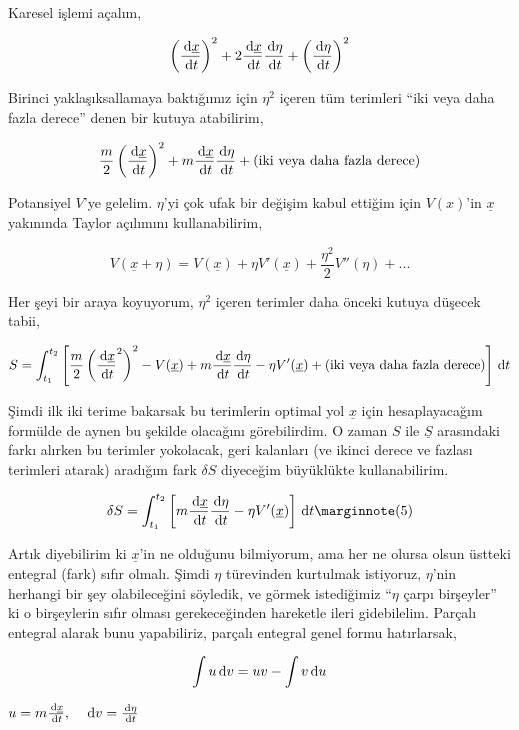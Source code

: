 \documentclass[12pt,fleqn]{article}\usepackage{../../common}
\begin{document}
Karesel işlemi açalım, 

$$ 
\left( \frac{\,\mathrm{d} \underline{x}}{\,\mathrm{d} t}\right)^2 + 
2 \frac{\,\mathrm{d} \underline{x}}{\,\mathrm{d} t} \frac{\,\mathrm{d} \eta}{\,\mathrm{d} t} +
\left( \frac{\,\mathrm{d} \eta}{\,\mathrm{d} t}\right)^2
$$

Birinci yaklaşıksallamaya baktığımız için $\eta^2$ içeren tüm terimleri
``iki veya daha fazla derece'' denen bir kutuya atabilirim, 

$$ 
\frac{m}{2} \left( \frac{\,\mathrm{d} \underline{x}}{\,\mathrm{d} t}\right)^2 + 
m \frac{\,\mathrm{d} \underline{x}}{\,\mathrm{d} t} \frac{\,\mathrm{d} \eta}{\,\mathrm{d} t} + 
(\textrm{iki veya daha fazla derece})
$$

Potansiyel $V$'ye gelelim. $\eta$'yi çok ufak bir değişim kabul ettiğim
için $V(x)$'in $\underline{x}$ yakınında Taylor açılımını kullanabilirim, 

$$ 
V(\underline{x} + \eta) = 
V(\underline{x}) + \eta V'(\underline{x}) + 
\frac{\eta^2}{2}V''(\eta) + ...
$$

Her şeyi bir araya koyuyorum, $\eta^2$ içeren terimler daha önceki kutuya
düşecek tabii, 

$$ 
S = \int_{t_1}^{t_2} \left[
\frac{m}{2} \left( \frac{\,\mathrm{d} \underline{x}}{\,\mathrm{d} t}^2 \right)^2
- V(\underline{x}) 
+ m \frac{\,\mathrm{d} \underline{x}}{\,\mathrm{d} t} \frac{\,\mathrm{d} \eta}{\,\mathrm{d} t} 
- \eta V'(\underline{x}) + (\textrm{iki veya daha fazla derece})
\right] \,\mathrm{d} t 
$$

Şimdi ilk iki terime bakarsak bu terimlerin optimal yol $\underline{x}$
için hesaplayacağım formülde de aynen bu şekilde olacağını görebilirdim. O
zaman $S$ ile $\underline{S}$ arasındaki farkı alırken bu terimler
yokolacak, geri kalanları (ve ikinci derece ve fazlası terimleri atarak)
aradığım fark $\delta S$ diyeceğim büyüklükte kullanabilirim.

$$ 
\delta S = \int_{t_1}^{t_2} \left[ 
m \frac{\ud\underline{x}}{\ud t} \frac{\ud\eta}{\ud t} - \eta V'(\underline{x})
\right] \ud t 
\mlabel{5}
$$

Artık diyebilirim ki $\underline{x}$'in ne olduğunu bilmiyorum, ama her ne
olursa olsun üstteki entegral (fark) sıfır olmalı. Şimdi $\eta$ türevinden
kurtulmak istiyoruz, $\eta$'nin herhangi bir şey olabileceğini söyledik, ve
görmek istediğimiz ``$\eta$ çarpı birşeyler'' ki o birşeylerin sıfır olması
gerekeceğinden hareketle ileri gidebilelim. Parçalı entegral alarak bunu
yapabiliriz, parçalı entegral genel formu hatırlarsak,

$$ 
\int u \,\mathrm{d} v = uv - \int v \,\mathrm{d} u
$$

$u = m \frac{\,\mathrm{d}\underline{x}}{\,\mathrm{d} t}, \quad \,\mathrm{d} v = \frac{\,\mathrm{d} \eta}{\,\mathrm{d} t}$
\end{document}
